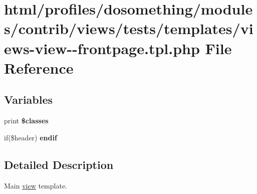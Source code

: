 \hypertarget{views-view--frontpage_8tpl_8php}{
\section{html/profiles/dosomething/modules/contrib/views/tests/templates/views-\/view-\/-\/frontpage.tpl.php File Reference}
\label{views-view--frontpage_8tpl_8php}
}
\subsection*{Variables}
\begin{DoxyCompactItemize}
\item 
\hypertarget{views-view--frontpage_8tpl_8php_a6d48ecbdbc70ca1812e665169b5fa1e2}{
print {\bfseries \$classes}}
\label{views-view--frontpage_8tpl_8php_a6d48ecbdbc70ca1812e665169b5fa1e2}

\item 
\hypertarget{views-view--frontpage_8tpl_8php_a97b8be73630a68d46603ea9f55f6957c}{
if(\$header) {\bfseries endif}}
\label{views-view--frontpage_8tpl_8php_a97b8be73630a68d46603ea9f55f6957c}

\end{DoxyCompactItemize}


\subsection{Detailed Description}
Main \hyperlink{classview}{view} template.

